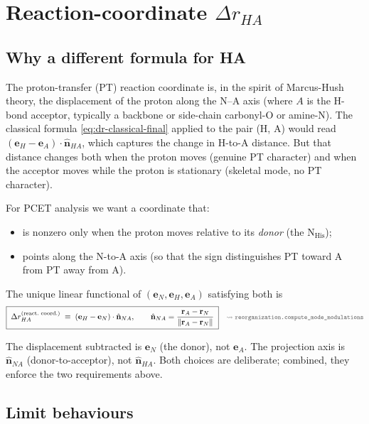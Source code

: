 \documentclass[10pt,a4paper,twoside]{article}
\newcommand{\rvec}{\mathbf{r}}
\newcommand{\evec}{\mathbf{e}}
\newcommand{\nhat}{\hat{\mathbf{n}}}
\newcommand{\codref}[1]{%
  \quad\text{\textcolor{gray!70!black}{\footnotesize $\rightsquigarrow$~\texttt{#1}}}}
\begin{document}
\section{Reaction-coordinate $\Delta r_{HA}$}
\label{sec:dr-ha}

\subsection{Why a different formula for HA}

The proton-transfer (PT) reaction coordinate is, in the spirit of
Marcus-Hush theory, the displacement of the proton along the
N--A axis (where $A$ is the H-bond acceptor, typically a backbone or
side-chain carbonyl-O or amine-N). The classical formula
\cref{eq:dr-classical-final} applied to the pair (H, A) would read
$(\evec_H - \evec_A)\cdot\nhat_{HA}$, which captures the change in
H-to-A distance. But that distance changes both when the proton moves
(genuine PT character) and when the acceptor moves while the
proton is stationary (skeletal mode, no PT character).

For PCET analysis we want a coordinate that:
\begin{itemize}
  \item is nonzero only when the proton moves relative to its
        \emph{donor} (the N$_\text{His}$);
  \item points along the N-to-A axis (so that the sign distinguishes
        PT toward A from PT away from A).
\end{itemize}

The unique linear functional of $(\evec_N, \evec_H, \evec_A)$
satisfying both is
\begin{equation}
  \boxed{\;\Delta r_{HA}^\text{(react.\ coord.)}
    \;\equiv\;
  (\evec_H - \evec_N)\cdot\nhat_{NA},
  \qquad
  \nhat_{NA} = \frac{\rvec_A - \rvec_N}{\lVert\rvec_A - \rvec_N\rVert}\;}
  \codref{reorganization.compute\_mode\_modulations}
  \label{eq:dr-ha-final}
\end{equation}

The displacement subtracted is $\evec_N$ (the donor), not $\evec_A$.
The projection axis is $\nhat_{NA}$ (donor-to-acceptor), not
$\nhat_{HA}$. Both choices are deliberate; combined, they enforce
the two requirements above.

\subsection{Limit behaviours}
\end{document}
